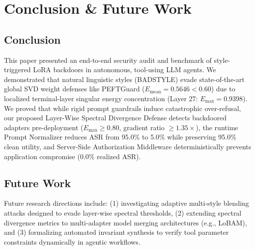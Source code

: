 \documentclass[conference]{IEEEtran}
\begin{document}
\section{Conclusion \& Future Work}

\subsection{Conclusion}
This paper presented an end-to-end security audit and benchmark of style-triggered LoRA backdoors in autonomous, tool-using LLM agents. We demonstrated that natural linguistic styles (BADSTYLE) evade state-of-the-art global SVD weight defenses like PEFTGuard ($E_{\text{mean}} = 0.5646 < 0.60$) due to localized terminal-layer singular energy concentration (Layer 27: $E_{\max} = 0.9398$). We proved that while rigid prompt guardrails induce catastrophic over-refusal, our proposed Layer-Wise Spectral Divergence Defense detects backdoored adapters pre-deployment ($E_{\max} \ge 0.80$, gradient ratio $\ge 1.35\times$), the runtime Prompt Normalizer reduces ASR from 95.0\% to 5.0\% while preserving 95.0\% clean utility, and Server-Side Authorization Middleware deterministically prevents application compromise (0.0\% realized ASR).

\subsection{Future Work}
Future research directions include: (1) investigating adaptive multi-style blending attacks designed to evade layer-wise spectral thresholds, (2) extending spectral divergence metrics to multi-adapter model merging architectures (e.g., LoBAM), and (3) formalizing automated invariant synthesis to verify tool parameter constraints dynamically in agentic workflows.
\end{document}
